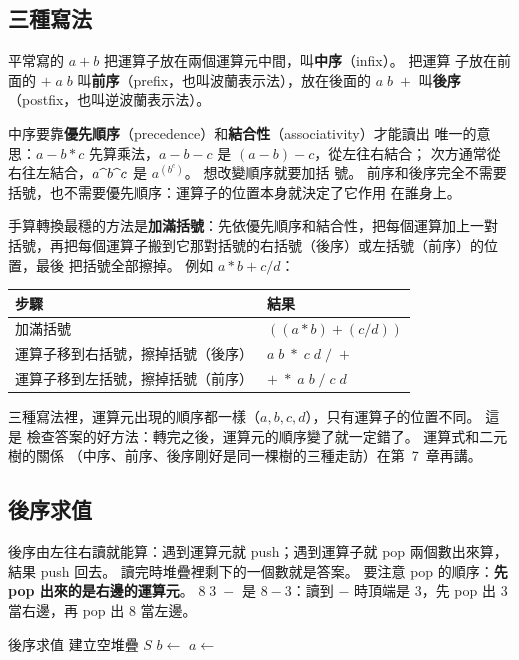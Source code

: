 \subsection{三種寫法}

平常寫的 $a + b$ 把運算子放在兩個運算元中間，叫\textbf{中序}（infix）。 把運算
子放在前面的 $+\;a\;b$ 叫\textbf{前序}（prefix，也叫波蘭表示法），放在後面的
$a\;b\;+$ 叫\textbf{後序}（postfix，也叫逆波蘭表示法）。

中序要靠\textbf{優先順序}（precedence）和\textbf{結合性}（associativity）才能讀出
唯一的意思：$a - b * c$ 先算乘法，$a - b - c$ 是 $(a - b) - c$，從左往右結合；
次方通常從右往左結合，$a \text{\textasciicircum} b \text{\textasciicircum} c$ 是 $a^{(b^c)}$。 想改變順序就要加括
號。 前序和後序完全不需要括號，也不需要優先順序：運算子的位置本身就決定了它作用
在誰身上。

手算轉換最穩的方法是\textbf{加滿括號}：先依優先順序和結合性，把每個運算加上一對
括號，再把每個運算子搬到它那對括號的右括號（後序）或左括號（前序）的位置，最後
把括號全部擦掉。 例如 $a * b + c / d$：

\begin{center}
\begin{tabular}{ll}
\toprule
步驟 & 結果 \\
\midrule
加滿括號 & $((a * b) + (c / d))$ \\
運算子移到右括號，擦掉括號（後序）& $a\;b\;*\;c\;d\;/\;+$ \\
運算子移到左括號，擦掉括號（前序）& $+\;*\;a\;b\;/\;c\;d$ \\
\bottomrule
\end{tabular}
\end{center}

三種寫法裡，運算元出現的順序都一樣（$a, b, c, d$），只有運算子的位置不同。 這是
檢查答案的好方法：轉完之後，運算元的順序變了就一定錯了。 運算式和二元樹的關係
（中序、前序、後序剛好是同一棵樹的三種走訪）在第~7~章再講。

\subsection{後序求值}
\label{sec:sq-postfix-eval}

後序由左往右讀就能算：遇到運算元就 push；遇到運算子就 pop 兩個數出來算，結果
push 回去。 讀完時堆疊裡剩下的一個數就是答案。 要注意 pop 的順序：\textbf{先 pop
出來的是右邊的運算元}。 $8\;3\;-$ 是 $8 - 3$：讀到 $-$ 時頂端是 $3$，先 pop 出
$3$ 當右邊，再 pop 出 $8$ 當左邊。

\begin{pseudo}[label=alg:sq-postfix-eval]{後序求值}
 
    \State 建立空堆疊 $S$
            \State {}
        \Else
            \State $b \gets$  
            \State $a \gets$  
            \State {}
        \EndIf
    \EndFor
    \State \Return {}
\EndFunction
\end{pseudo}

